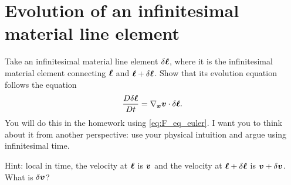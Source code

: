 \documentclass[11pt,letterpaper]{article}
\begin{document}
\section{Evolution of an infinitesimal material line element}
Take an infinitesimal material line element $\delta\boldsymbol{\ell}$, where it is the
infinitesimal material element connecting $\boldsymbol{\ell}$ and $\boldsymbol{\ell}+\delta\boldsymbol{\ell}$. Show that its evolution equation follows the equation
\begin{align}
    \frac{D\delta\boldsymbol{\ell}}{Dt}=\nabla_{\boldsymbol{x}}\boldsymbol{v}\cdot \delta\boldsymbol{\ell}.
\end{align}
You will do this in the homework using \eqref{eq:F_eq_euler}. I want you to think about it from another perspective: use your physical intuition and argue using infinitesimal time. 

Hint: local in time, the velocity at $\boldsymbol{\ell}$ is $\boldsymbol{v}$ and the velocity at $\boldsymbol{\ell}+\delta\boldsymbol{\ell}$ is $\boldsymbol{v}+\delta\boldsymbol{v}$. What is $\delta\boldsymbol{v}$?

    
\vfill
\printbibliography
\end{document}
